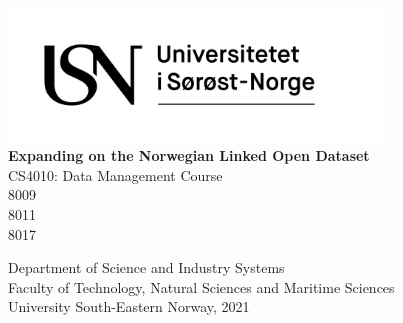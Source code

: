 \thispagestyle{empty}

\begin{center}

\includegraphics[width=10cm]{figures/logos/USN_logo_rgb.png}\\[5pc]

\textbf{\Huge{Expanding on the Norwegian Linked Open Dataset}}\\[0.1pc]

\small{CS4010: Data Management Course}\\[7pc]

\Large{8009}\\
\Large{8011}\\
\Large{8017}\\

\vfill

\large{Department of Science and Industry Systems}\\[1pc]
\large{Faculty of Technology, Natural Sciences and Maritime Sciences}\\[1pc]
\large{University South-Eastern Norway, 2021}\\[1pc]

\end{center}
